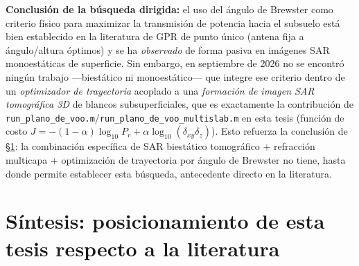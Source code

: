 \documentclass[11pt,a4paper]{article}
\begin{document}
\textbf{Conclusión de la búsqueda dirigida:} el uso del ángulo de Brewster
como criterio físico para maximizar la transmisión de potencia hacia el
subsuelo está bien establecido en la literatura de GPR de punto único
(antena fija a ángulo/altura óptimos) y se ha \emph{observado} de forma
pasiva en imágenes SAR monoestáticas de superficie. Sin embargo, en
septiembre de 2026 no se encontró ningún trabajo —biestático ni
monoestático— que integre ese criterio dentro de un \emph{optimizador de
trayectoria} acoplado a una \emph{formación de imagen SAR tomográfica 3D}
de blancos subsuperficiales, que es exactamente la contribución de
\texttt{run\_plano\_de\_voo.m}/\texttt{run\_plano\_de\_voo\_multislab.m} en
esta tesis (función de costo
$J=-(1-\alpha)\log_{10}P_r+\alpha\log_{10}(\delta_{xy}\delta_z)$). Esto
refuerza la conclusión de \S\ref{sec:sintesis}: la combinación específica
de SAR biestático tomográfico + refracción multicapa + optimización de
trayectoria por ángulo de Brewster no tiene, hasta donde permite establecer
esta búsqueda, antecedente directo en la literatura.

\section{Síntesis: posicionamiento de esta tesis respecto a la literatura}
\label{sec:sintesis}
\end{document}

